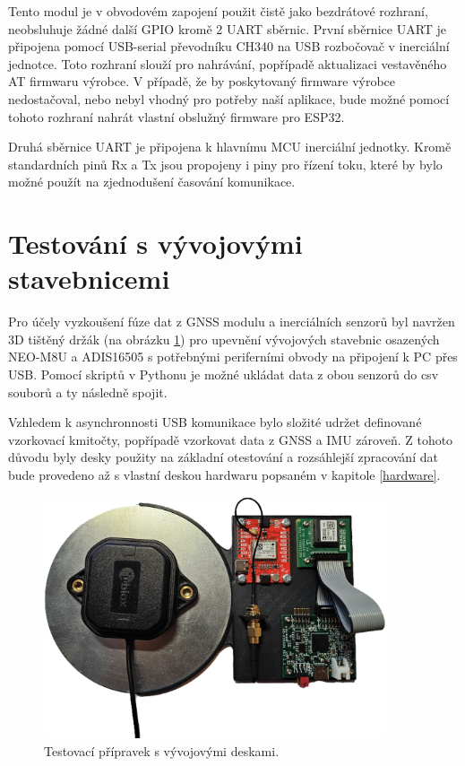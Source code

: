 Tento modul je v obvodovém zapojení použit čistě jako bezdrátové rozhraní, neobsluhuje žádné další \ac{GPIO} kromě 2 \ac{UART} sběrnic. První sběrnice \ac{UART} je připojena pomocí USB-serial převodníku CH340 na \ac{USB} rozbočovač v inerciální jednotce. Toto rozhraní slouží pro nahrávání, popřípadě aktualizaci vestavěného AT firmwaru výrobce. V případě, že by poskytovaný firmware výrobce nedostačoval, nebo nebyl vhodný pro potřeby naší aplikace, bude možné pomocí tohoto rozhraní nahrát vlastní obslužný firmware pro ESP32.

Druhá sběrnice \ac{UART} je připojena k hlavnímu \ac{MCU} inerciální jednotky. Kromě standardních pinů Rx a Tx jsou propojeny i piny pro řízení toku, které by bylo možné použít na zjednodušení časování komunikace.

\section{Testování s vývojovými stavebnicemi}
Pro účely vyzkoušení fúze dat z \ac{GNSS} modulu a inerciálních senzorů byl navržen 3D tištěný držák (na obrázku \ref{fig:devBoards}) pro upevnění vývojových stavebnic osazených NEO-M8U a ADIS16505 s potřebnými periferními obvody na připojení k PC přes \ac{USB}. Pomocí skriptů v Pythonu je možné ukládat data z obou senzorů do csv souborů a ty následně spojit.

Vzhledem k asynchronnosti \ac{USB} komunikace bylo složité udržet definované vzorkovací kmitočty, popřípadě vzorkovat data z \ac{GNSS} a \ac{IMU} zároveň. Z tohoto důvodu byly desky použity na základní otestování a rozsáhlejší zpracování dat bude provedeno až s vlastní deskou hardwaru popsaném v kapitole \ref{hardware}.
\begin{figure}[h] 
    \centering
    \includegraphics[width=0.9\textwidth]{obrazky/devBoards}
    \caption{Testovací přípravek s vývojovými deskami.}
    \label{fig:devBoards}
\end{figure}

